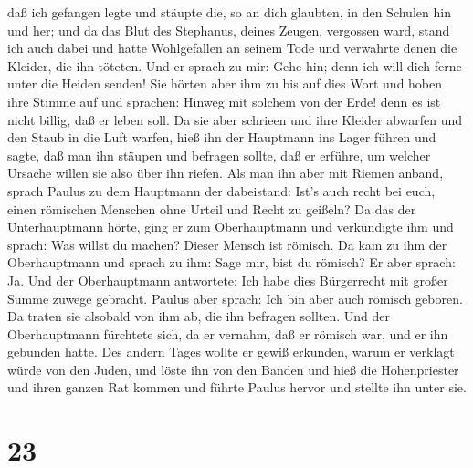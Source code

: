 daß ich gefangen legte und stäupte die, so an dich glaubten, in den
Schulen hin und her;  und da das Blut des Stephanus, deines
Zeugen, vergossen ward, stand ich auch dabei und hatte Wohlgefallen an
seinem Tode und verwahrte denen die Kleider, die ihn töteten.
 Und er sprach zu mir: Gehe hin; denn ich will dich ferne
unter die Heiden senden!  Sie hörten aber ihm zu bis auf
dies Wort und hoben ihre Stimme auf und sprachen: Hinweg mit solchem von
der Erde! denn es ist nicht billig, daß er leben soll.  Da
sie aber schrieen und ihre Kleider abwarfen und den Staub in die Luft
warfen,  hieß ihn der Hauptmann ins Lager führen und sagte,
daß man ihn stäupen und befragen sollte, daß er erführe, um welcher
Ursache willen sie also über ihn riefen.  Als man ihn aber
mit Riemen anband, sprach Paulus zu dem Hauptmann der dabeistand: Ist's
auch recht bei euch, einen römischen Menschen ohne Urteil und Recht zu
geißeln?  Da das der Unterhauptmann hörte, ging er zum
Oberhauptmann und verkündigte ihm und sprach: Was willst du machen?
Dieser Mensch ist römisch.  Da kam zu ihm der Oberhauptmann
und sprach zu ihm: Sage mir, bist du römisch? Er aber sprach: Ja.
 Und der Oberhauptmann antwortete: Ich habe dies
Bürgerrecht mit großer Summe zuwege gebracht. Paulus aber sprach: Ich
bin aber auch römisch geboren.  Da traten sie alsobald von
ihm ab, die ihn befragen sollten. Und der Oberhauptmann fürchtete sich,
da er vernahm, daß er römisch war, und er ihn gebunden hatte.
 Des andern Tages wollte er gewiß erkunden, warum er
verklagt würde von den Juden, und löste ihn von den Banden und hieß die
Hohenpriester und ihren ganzen Rat kommen und führte Paulus hervor und
stellte ihn unter sie.

\hypertarget{section-22}{%
\section{23}\label{section-22}}

